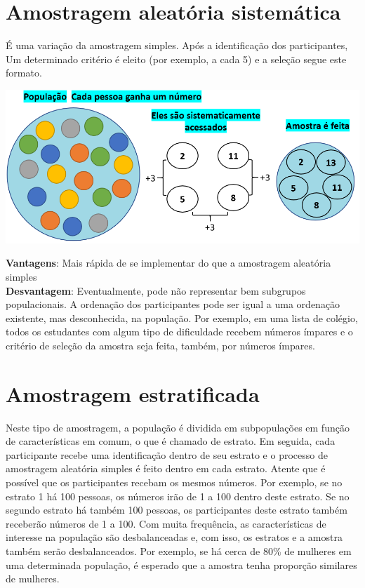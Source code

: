\documentclass[
]{book}
\begin{document}
\hypertarget{amostragem-aleatuxf3ria-sistemuxe1tica}{%
\section{Amostragem aleatória sistemática}\label{amostragem-aleatuxf3ria-sistemuxe1tica}}

É uma variação da amostragem simples. Após a identificação dos participantes, Um determinado critério é eleito (por exemplo, a cada 5) e a seleção segue este formato.

\includegraphics{./img/cap_a_sistematica.png}

\textbf{Vantagens}: Mais rápida de se implementar do que a amostragem aleatória simples\\
\textbf{Desvantagem}: Eventualmente, pode não representar bem subgrupos populacionais. A ordenação dos participantes pode ser igual a uma ordenação existente, mas desconhecida, na população. Por exemplo, em uma lista de colégio, todos os estudantes com algum tipo de dificuldade recebem números ímpares e o critério de seleção da amostra seja feita, também, por números ímpares.

\hypertarget{amostragem-estratificada}{%
\section{Amostragem estratificada}\label{amostragem-estratificada}}

Neste tipo de amostragem, a população é dividida em subpopulações em função de características em comum, o que é chamado de estrato. Em seguida, cada participante recebe uma identificação dentro de seu estrato e o processo de amostragem aleatória simples é feito dentro em cada estrato. Atente que é possível que os participantes recebam os mesmos números. Por exemplo, se no estrato 1 há 100 pessoas, os números irão de 1 a 100 dentro deste estrato. Se no segundo estrato há também 100 pessoas, os participantes deste estrato também receberão números de 1 a 100. Com muita frequência, as características de interesse na população são desbalanceadas e, com isso, os estratos e a amostra também serão desbalanceados. Por exemplo, se há cerca de 80\% de mulheres em uma determinada população, é esperado que a amostra tenha proporção similares de mulheres.
\end{document}

